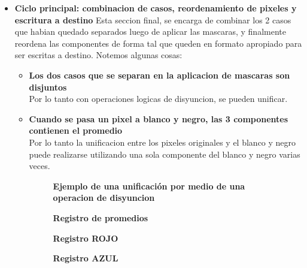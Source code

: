 \begin{itemize}
       \newpage 
  \item \textbf{Ciclo principal: combinacion de casos, reordenamiento de pixeles y escritura a destino}
        Esta seccion final, se encarga de combinar los 2 casos que habian quedado separados luego de aplicar las mascaras, y finalmente reordena las componentes de forma tal que queden en formato apropiado para ser escritas a destino. Notemos algunas cosas:
          \begin{itemize}
            \item \textbf{Los dos casos que se separan en la aplicacion de mascaras son disjuntos}\\
                  Por lo tanto con operaciones logicas de disyuncion, se pueden unificar.
            \item \textbf{Cuando se pasa un pixel a blanco y negro, las 3 componentes contienen el promedio}\\
                  Por lo tanto la unificacion entre los pixeles originales y el blanco y negro puede realizarse utilizando una sola componente del blanco y negro varias veces.

	   \begin{figure}[!ht]
              \centering
              \par      
              \textbf{Ejemplo de una unificación por medio de una operacion de disyuncion}
              \bigskip
              \par  
               \textbf{Registro de promedios}
            \bigskip
            
			 \textbf{Registro ROJO}
                 \bigskip         
            
            \textbf{Registro AZUL}
				 \bigskip              
              

\end{figure}
\end{itemize}
\end{itemize}
